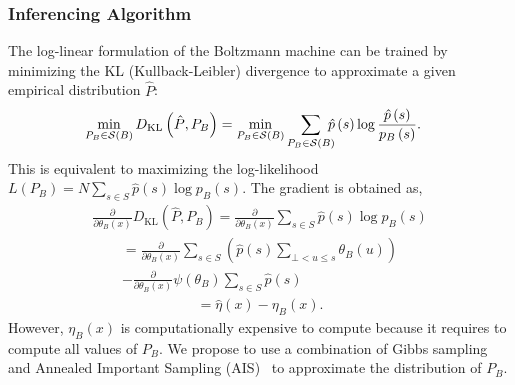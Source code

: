 \documentclass[letterpaper]{article} %
\begin{document}
		\subsubsection{Inferencing Algorithm}
			The log-linear formulation of the Boltzmann machine can be trained by minimizing the KL (Kullback-Leibler) divergence to approximate a given empirical distribution $\hat{P}$:
			\begin{align}
				\min_{P_B \in \mathcal{S} \left( B \right)} D_{\mathrm{KL}} \left( \hat{P}, P_B \right) &= \min_{P_B \in \mathcal{S} \left( B \right)}\ \ \ \sum_{\mathclap{P_B \in \mathcal{S} \left( B \right)}}\ \hat{p} \left( s \right) \log \frac{\hat{p} \left( s \right)}{p_B \left( s \right)}. \label{eqn:KL_diveregence_BM}
			\end{align}
			This is equivalent to maximizing the log-likelihood $L \left( P_B \right) = N \sum_{s \in S} \hat{p} \left( s \right) \log p_{B} \left( s \right)$.
			The gradient is obtained as,
			\begin{align*}
				\frac{\partial}{\partial \theta_B \left( x \right)} D_{\mathrm{KL}} \left( \hat{P}, P_B \right) = \frac{\partial}{\partial \theta_B \left( x \right)} \sum_{s \in S} \hat{p} \left( s \right) \log p_B \left( s \right)
			\end{align*}
			\begin{multline*}
				= \frac{\partial}{\partial \theta_B \left( x \right)} \sum_{s \in S} \left( \hat{p} \left( s \right) \sum_{\bot < u \le s} \theta_B \left( u \right) \right) \\
				- \frac{\partial}{\partial \theta_B \left( x \right)} \psi \left( \theta_B \right) \sum_{s \in S} \hat{p} \left( s \right)
			\end{multline*}
			\begin{align*}
				= \hat{\eta} \left( x \right) - \eta_B \left( x \right).
			\end{align*}
			However, $\eta_{B} \left( x \right)$ is computationally expensive to compute because it requires to compute all values of $P_B$. We propose to use a combination of Gibbs sampling and Annealed Important Sampling (AIS)~\cite{neal2001annealed,salakhutdinov2008learning} to approximate the distribution of $P_B$.
\end{document}
